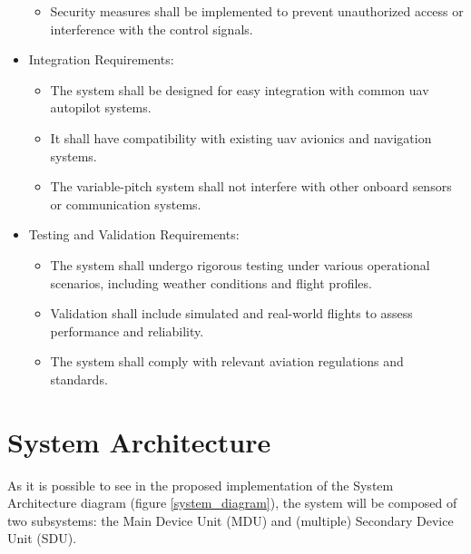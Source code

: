\begin{itemize}
\begin{itemize}
              \item Security measures shall be implemented to prevent unauthorized access or interference with the control signals.
          \end{itemize}
    \item Integration Requirements:
          \begin{itemize}
              \item The system shall be designed for easy integration with common \gls{uav} autopilot systems.
              \item It shall have compatibility with existing \gls{uav} avionics and navigation systems.
              \item The variable-pitch system shall not interfere with other onboard sensors or communication systems.
          \end{itemize}
    \item Testing and Validation Requirements:
          \begin{itemize}
              \item The system shall undergo rigorous testing under various operational scenarios, including weather conditions and flight profiles.
              \item Validation shall include simulated and real-world flights to assess performance and reliability.
              \item The system shall comply with relevant aviation regulations and standards.
          \end{itemize}
\end{itemize}

\section{System Architecture}
As it is possible to see in the proposed implementation of the System Architecture diagram (figure \ref{system_diagram}), the system will be composed of two subsystems: the Main Device Unit (MDU) and (multiple) Secondary Device Unit (SDU).

